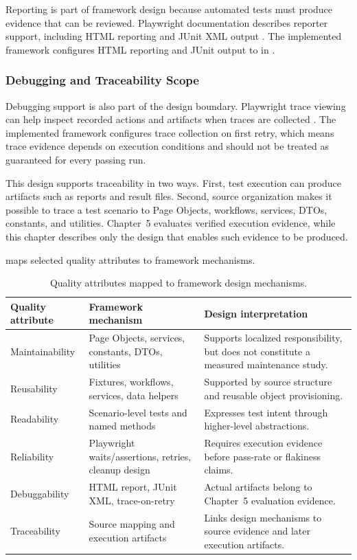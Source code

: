 Reporting is part of framework design because automated tests must produce evidence that can be reviewed. Playwright documentation describes reporter support, including HTML reporting and JUnit XML output \autocite{playwright_docs_reporters_2026}. The implemented framework configures HTML reporting and JUnit output to  in .

\subsubsection{Debugging and Traceability Scope}
\label{subsubsec:ch3-debugging-traceability-scope}

Debugging support is also part of the design boundary. Playwright trace viewing can help inspect recorded actions and artifacts when traces are collected \autocite{playwright_docs_trace_viewer_2026}. The implemented framework configures trace collection on first retry, which means trace evidence depends on execution conditions and should not be treated as guaranteed for every passing run.

This design supports traceability in two ways. First, test execution can produce artifacts such as reports and result files. Second, source organization makes it possible to trace a test scenario to Page Objects, workflows, services, DTOs, constants, and utilities. Chapter~5 evaluates verified execution evidence, while this chapter describes only the design that enables such evidence to be produced.

 maps selected quality attributes to framework mechanisms.

\begin{table}[htbp]
  \centering
  \tablefont
  \begin{tabularx}{\textwidth}{YYY}
    \toprule
    Quality attribute & Framework mechanism & Design interpretation \\
    \midrule
    Maintainability & Page Objects, services, constants, DTOs, utilities & Supports localized responsibility, but does not constitute a measured maintenance study. \\
    Reusability & Fixtures, workflows, services, data helpers & Supported by source structure and reusable object provisioning. \\
    Readability & Scenario-level tests and named methods & Expresses test intent through higher-level abstractions. \\
    Reliability & Playwright waits/assertions, retries, cleanup design & Requires execution evidence before pass-rate or flakiness claims. \\
    Debuggability & HTML report, JUnit XML, trace-on-retry & Actual artifacts belong to Chapter~5 evaluation evidence. \\
    Traceability & Source mapping and execution artifacts & Links design mechanisms to source evidence and later execution artifacts. \\
    \bottomrule
  \end{tabularx}
  \caption{Quality attributes mapped to framework design mechanisms.}
  \label{tab:quality-attributes-framework-mechanisms}
\end{table}


